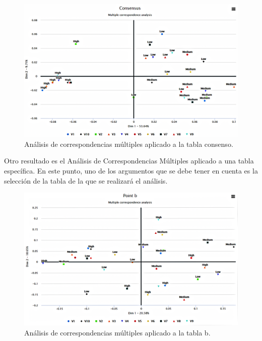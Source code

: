 \documentclass[water,article,submit,moreauthors,pdftex]{mdpi}
\begin{document}
\begin{figure}[!ht]



\begin{center}\includegraphics[width=0.9\linewidth,]{CONS1} \end{center}

\caption{Análisis de correspondencias múltiples aplicado a la tabla consenso.}

\label{fig:CONS1}
\end{figure}

Otro resultado es el Análisis de Correspondencias Múltiples aplicado a
una tabla específica. En este punto, uno de los argumentos que se debe
tener en cuenta es la selección de la tabla de la que se realizará el
análisis.

\begin{figure}[!ht]



\begin{center}\includegraphics[width=0.9\linewidth,]{MCAb} \end{center}

\caption{Análisis de correspondencias múltiples aplicado a la tabla b.}

\label{fig:MCAb}
\end{figure}
\end{document}
